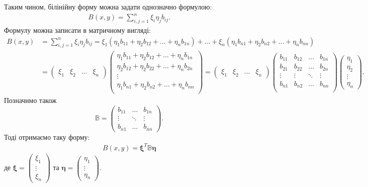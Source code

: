 \documentclass{math_library}
\begin{document}
Таким чином, білінійну форму можна задати однозначно формулою:
\begin{align*}
B(x,y) = \sum_{i,j=1}^n \xi_i \eta_j b_{ij}.
\end{align*}
Формулу можна записати в матричному вигляді:
\begin{align*}
B(x,y) & = \displaystyle\sum_{i,j=1}^n \xi_i \eta_j b_{ij} = \xi_1 \left( \eta_1 b_{11} + \eta_2 b_{12} + \dots + \eta_n b_{1n} \right) + \dots + \xi_n \left( \eta_1 b_{n1} + \eta_2 b_{n2} + \dots + \eta_n b_{nn} \right) \\ & = \begin{pmatrix}
\xi_1 & \xi_2 & \dots & \xi_n
\end{pmatrix} \begin{pmatrix}
\eta_1 b_{11} + \eta_2 b_{12} + \dots + \eta_n b_{1n} \\
\eta_2 b_{12} + \eta_2 b_{22} + \dots + \eta_n b_{2n} \\
\vdots \\
\eta_1 b_{n1} + \eta_2 b_{n2} + \dots + \eta_n b_{nn} \\
\end{pmatrix} = \begin{pmatrix}
\xi_1 & \xi_2 & \dots & \xi_n
\end{pmatrix} \begin{pmatrix}
b_{11} & b_{12} & \dots & b_{1n} \\
b_{21} & b_{22} & \dots & b_{2n} \\
\vdots & \vdots & \ddots & \vdots \\
b_{n1} & b_{n2} & \dots & b_{nn} \\
\end{pmatrix} \begin{pmatrix}
\eta_1 \\ \eta_2 \\ \vdots \\ \eta_n
\end{pmatrix}.
\end{align*}
Позначимо також 
\[
\mathbb{B} = \begin{pmatrix}
b_{11} & \dots & b_{1n} \\
\vdots & \ddots & \vdots \\
b_{n1} & \dots & b_{nn}
\end{pmatrix}.
\]
Тоді отримаємо таку форму:
\begin{align*}
B(x,y) = \bm{\xi}^T \mathbb{B} \bm{\eta}
\end{align*}
де $\bm{\xi} = \begin{pmatrix}
\xi_1 \\ \vdots \\ \xi_n
\end{pmatrix}$ та $\bm{\eta} = \begin{pmatrix}
\eta_1 \\ \vdots \\ \eta_n
\end{pmatrix}$.\\
\end{document}
